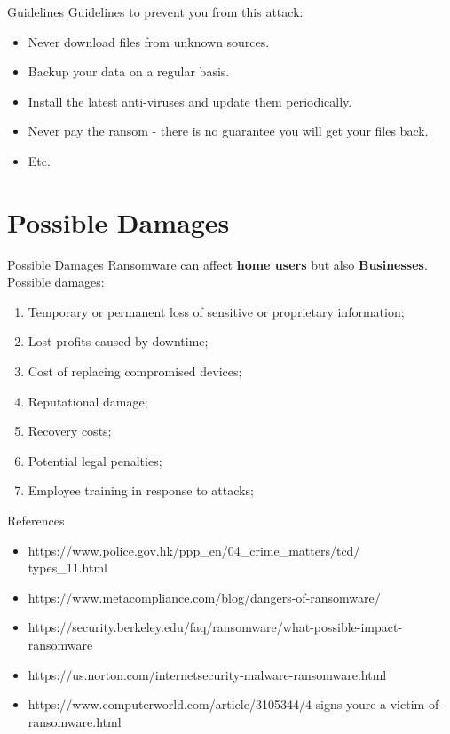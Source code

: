 \documentclass{beamer}
\begin{document}
	\begin{frame}{Guidelines}
	    Guidelines to prevent you from this attack:
		\begin{itemize}[<+->]
			\item Never download files from unknown sources.
            \item Backup your data on a regular basis.
            \item Install the latest anti-viruses and update them periodically.
            \item Never pay the ransom - there is no guarantee you will get your files back.
            \item<4-> Etc.
		\end{itemize}
	\end{frame}
	
	\section{Possible Damages}
	
	\begin{frame}{Possible Damages}
	    Ransomware can affect \textbf{home users} but also \textbf{Businesses}.\\
	    \pause
	    Possible damages:
		\begin{enumerate}[<+->]
		    \item Temporary or permanent loss of sensitive or proprietary information;
		    \item Lost profits caused by downtime;
			\item Cost of replacing compromised devices;
			\item Reputational damage;
			\item Recovery costs;
			\item Potential legal penalties;
			\item Employee training in response to attacks;
		\end{enumerate}
	\end{frame}
	
	\begin{frame}{References}
		\begin{itemize}
		    \item https://www.police.gov.hk/ppp\_en/04\_crime\_matters/tcd/\\types\_11.html
			\item https://www.metacompliance.com/blog/dangers-of-ransomware/
			\item https://security.berkeley.edu/faq/ransomware/what-possible-impact-ransomware
			\item https://us.norton.com/internetsecurity-malware-ransomware.html 
            \item https://www.computerworld.com/article/3105344/4-signs-youre-a-victim-of-ransomware.html 

		\end{itemize}
	\end{frame}
	
\end{document}
